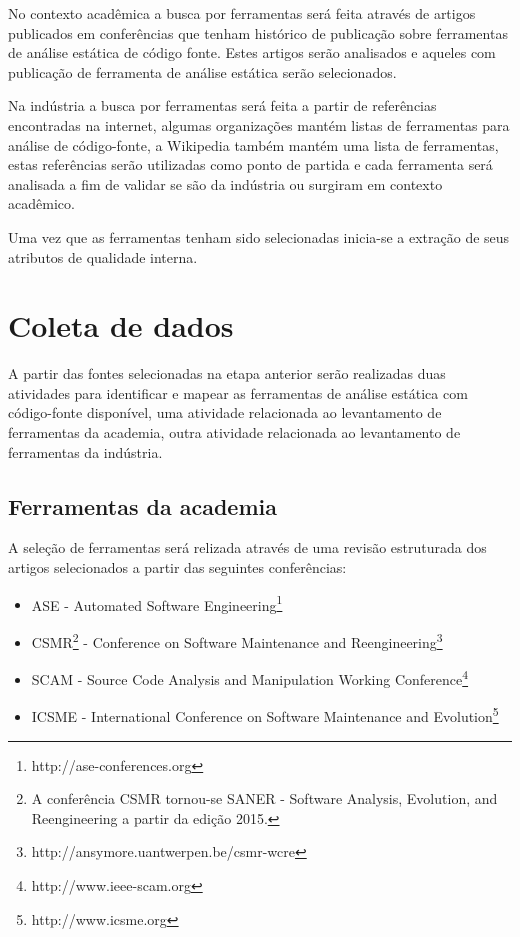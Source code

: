 \documentclass[qual, classic, a4paper]{ufbathesis}
\begin{document}
No contexto acadêmica a busca por ferramentas será feita
através de artigos publicados em conferências que tenham histórico de
publicação sobre ferramentas de análise estática de código fonte. Estes
artigos serão analisados e aqueles com publicação de ferramenta de análise
estática serão selecionados.

Na indústria a busca por ferramentas será feita a partir
de referências encontradas na internet, algumas organizações mantém listas de
ferramentas para análise de código-fonte, a Wikipedia também mantém uma lista
de ferramentas, estas referências serão utilizadas como ponto de partida e
cada ferramenta será analisada a fim de validar se são da indústria ou
surgiram em contexto acadêmico.

Uma vez que as ferramentas tenham sido selecionadas inicia-se a extração de
seus atributos de qualidade interna.

\section{Coleta de dados}

A partir das fontes selecionadas na etapa anterior serão realizadas duas
atividades para identificar e mapear as ferramentas de análise estática com
código-fonte disponível, uma atividade relacionada ao levantamento de
ferramentas da academia, outra atividade relacionada ao levantamento de
ferramentas da indústria.

\subsection{Ferramentas da academia}

A seleção de ferramentas será relizada através de uma revisão estruturada dos
artigos selecionados a partir das seguintes conferências:

\begin{itemize}
  \item ASE - Automated Software
    Engineering\footnote{http://ase-conferences.org}
  \item CSMR\footnote{A conferência CSMR tornou-se SANER - Software Analysis,
    Evolution, and Reengineering a partir da edição 2015.} - Conference on
    Software Maintenance and
    Reengineering\footnote{http://ansymore.uantwerpen.be/csmr-wcre}
  \item SCAM - Source Code Analysis and Manipulation Working
    Conference\footnote{http://www.ieee-scam.org}
  \item ICSME - International Conference on Software Maintenance and
    Evolution\footnote{http://www.icsme.org}
\end{itemize}
\end{document}
